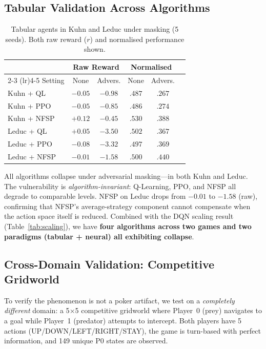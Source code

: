 \documentclass{article}
\begin{document}
\subsection{Tabular Validation Across Algorithms}
\label{sec:tabular}

\begin{table}[ht]
\centering
\caption{Tabular agents in Kuhn and Leduc under masking (5 seeds). Both raw reward ($r$) and normalised performance shown.}
\label{tab:tabular}
\begin{tabular}{lccccc}
\toprule
& \multicolumn{2}{c}{Raw Reward} & \multicolumn{2}{c}{Normalised} \\
\cmidrule(lr){2-3} \cmidrule(lr){4-5}
Setting & None & Advers. & None & Advers. \\
\midrule
Kuhn + QL & $-0.05$ & $-0.98$ & $.487$ & $.267$ \\
Kuhn + PPO & $-0.05$ & $-0.85$ & $.486$ & $.274$ \\
Kuhn + NFSP & $+0.12$ & $-0.45$ & $.530$ & $.388$ \\
Leduc + QL & $+0.05$ & $-3.50$ & $.502$ & $.367$ \\
Leduc + PPO & $-0.08$ & $-3.32$ & $.497$ & $.369$ \\
Leduc + NFSP & $-0.01$ & $-1.58$ & $.500$ & $.440$ \\
\bottomrule
\end{tabular}
\end{table}

All algorithms collapse under adversarial masking---in both Kuhn and Leduc. The vulnerability is \emph{algorithm-invariant}: Q-Learning, PPO, and NFSP all degrade to comparable levels. NFSP on Leduc drops from $-0.01$ to $-1.58$ (raw), confirming that NFSP's average-strategy component cannot compensate when the action space itself is reduced. Combined with the DQN scaling result (Table~\ref{tab:scaling}), we have \textbf{four algorithms across two games and two paradigms (tabular + neural) all exhibiting collapse}.

\subsection{Cross-Domain Validation: Competitive Gridworld}
\label{sec:crossdomain}

To verify the phenomenon is not a poker artifact, we test on a \emph{completely different} domain: a 5$\times$5 competitive gridworld where Player~0 (prey) navigates to a goal while Player~1 (predator) attempts to intercept. Both players have 5 actions (UP/DOWN/LEFT/RIGHT/STAY), the game is turn-based with perfect information, and 149 unique P0 states are observed.
\end{document}
